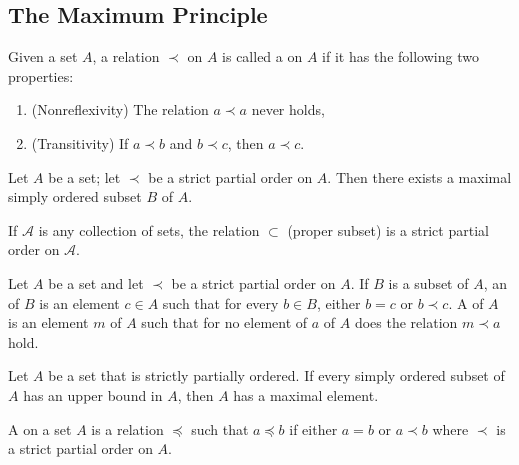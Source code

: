 \documentclass[12pt, a4paper, oneside, openright, titlepage]{book}
\begin{document}
\begin{appendices}
    \section{The Maximum Principle}

    \begin{definition}
        Given a set $A$, a relation $\prec$ on $A$ is called a  on $A$ if it has the following two properties: \begin{enumerate}
            \item (Nonreflexivity) The relation $a \prec a$ never holds,
            \item (Transitivity) If $a \prec b$ and $b \prec c$, then $a \prec c$.
        \end{enumerate}
    \end{definition}

    \begin{theorem}
        Let $A$ be a set; let $\prec$ be a strict partial order on $A$. Then there exists a maximal simply ordered subset $B$ of $A$.
    \end{theorem}


    \begin{example}
        If $\mathscr{A}$ is any collection of sets, the relation $\subset$ (proper subset) is a strict partial order on $\mathscr{A}$. 
    \end{example}

    \begin{definition}
        Let $A$ be a set and let $\prec$ be a strict partial order on $A$. If $B$ is a subset of $A$, an  of $B$ is an element $c \in A$ such that for every $b \in B$, either $b = c$ or $b \prec c$. A  of $A$ is an element $m$ of $A$ such that for no element of $a$ of $A$ does the relation $m \prec a$ hold.
    \end{definition}

    \begin{Lemma}
        Let $A$ be a set that is strictly partially ordered. If every simply ordered subset of $A$ has an upper bound in $A$, then $A$ has a maximal element.
    \end{Lemma}

    \begin{remark}
        A  on a set $A$ is a relation $\preceq$ such that $a \preceq b$ if either $a = b$ or $a \prec b$ where $\prec$ is a strict partial order on $A$.
    \end{remark}






\end{appendices}
\end{document}
